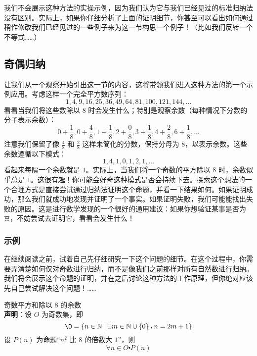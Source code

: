 我们不会展示这种方法的实操示例，因为我们认为它与我们已经见过的标准归纳法没有区别。实际上，如果你仔细分析了上面的证明细节，你甚至可以看出如何通过稍作修改我们已经见过的一些例子来为这一节构思一个例子！（比如我们反转一个不等式……）

\subsection{奇偶归纳}

让我们从一个观察开始引出这一节的内容，这将带领我们进入这种方法的第一个示例应用。考虑这样一个完全平方数序列：
\[1, 4, 9, 16, 25, 36, 49, 64, 81, 100, 121, 144, \dots\]
看看当我们将这些数除以 $8$ 时会发生什么；特别是观察余数（每种情况下分数的分子表示余数）：
\[0+\frac{1}{8}, 0+\frac{4}{8}, 1+\frac{1}{8}, 2+\frac{0}{8}, 3+\frac{1}{8}, 4+\frac{2}{8}, 6+\frac{1}{8},  \dots\]
注意我们保留了像 $\frac{4}{8}$ 和 $\frac{2}{8}$ 这样未简化的分数，保持分母为 $8$，以表示余数。这些余数遵循以下模式：
\[1, 4, 1, 0, 1, 2, 1, \dots\]
看起来每隔一个余数就是 $1$。实际上，当我们将一个奇数的平方除以 $8$ 时，余数似乎总是 $1$。这很有趣！你可能会好奇这种模式是否会持续下去。探索这个想法的一个合理方式是直接尝试通过归纳法证明这个命题，并看一下结果如何。如果证明成功，那么我们就成功地发现并证明了一个事实。如果证明失败，我们可能能找出失败的原因。这是进行数学发现的一个很好的通用建议：如果你想验证某事是否为\verb|真|，不妨尝试去证明它，看看会发生什么！

\subsubsection*{示例}

在继续阅读之前，试着自己先仔细研究一下这个问题的细节。在这个过程中，你需要弄清楚如何仅对奇数进行归纳，而不是像我们之前那样对所有自然数进行归纳。我们将会展示这个命题的证明，并在之后讨论这种方法的工作原理，但你绝对应该先自己尝试解决这个问题！……

\begin{example}{奇数平方和除以 $8$ 的余数}\\
   \textbf{声明}：设 $O$ 为奇数集，即
   \[\O = \{n \in \mathbb{N} \mid \exists m \in \mathbb{N} \cup \{0\} \centerdot n = 2m+1\}\]
   设 $P(n)$ 为命题``$n^2$ 比 $8$ 的倍数大 $1$''，则
   \[\forall n \in O \centerdot P(n)\]
\end{example}

